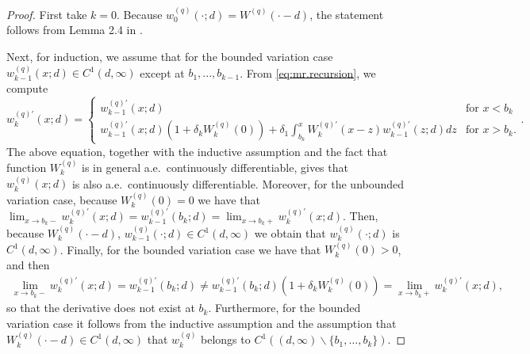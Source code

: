 \documentclass[12pt,reqno]{amsart}
\theoremstyle{definition}
\theoremstyle{remark}
\begin{document}
	\begin{proof}
	 
First take $k=0$. Because $w_0^{(q)}(\cdot;d)=W^{(q)}(\cdot-d)$, the statement follows from Lemma 2.4 in \cite{kuznetsovetal2012}.



Next, for induction, we assume that for the bounded variation case $w_{k-1}^{(q)}(x;d) \in C^1(d,\infty)$ except at $b_1,...,b_{k-1}$.
From \eqref{eq:mr.recursion}, we compute
$$ w_k^{(q)\prime}(x;d)=\left\{\begin{array}{cc}
w_{k-1}^{(q)\prime}(x;d)& \textrm{for $x < b_k$} \\ 
w_{k-1}^{(q)\prime}(x;d)(1+\delta_k W_k^{(q)}(0))+\delta_1\int_{b_k}^x W_k^{(q)\prime}(x-z)w_{k-1}^{(q)\prime}(z;d)dz & \textrm{for $x > b_k.$}
\end{array} \right..
$$
The above equation, together with the inductive assumption and the fact that function $W_k^{(q)} $ is in general a.e.~continuously differentiable, 
gives that $w_k^{(q)}(x;d)$ is also a.e.~continuously differentiable. 
Moreover, for the unbounded variation case, because $W_k^{(q)}(0)=0$ we have that
$\lim_{x \to b_k-}w_k^{(q)\prime}(x;d)=w_{k-1}^{(q)\prime}(b_k;d)= \lim_{x \to b_k +}w_k^{(q)\prime}(x;d)$. 
Then, because $W_k^{(q)}(\cdot-d)$, $w_{k-1}^{(q)}(\cdot;d) \in C^1(d,\infty)$ we obtain that $w_k^{(q)}(\cdot;d)$ is $C^1(d,\infty)$. 
Finally, for the bounded variation case we have that $W_k^{(q)}(0)>0$, and then 
\begin{align*}
\lim_{x \to b_k-}w_k^{(q)\prime}(x;d)=w_{k-1}^{(q)\prime}(b_k;d) \neq 
w_{k-1}^{(q)\prime}(b_k;d)(1+\delta_k W_k^{(q)}(0))= \lim_{x \to b_k+}w_k^{(q)\prime}(x;d),
\end{align*}
so that the derivative does not exist at $b_k$. 
Furthermore, for the bounded variation case it follows from the inductive assumption and the assumption that $W_k^{(q)}(\cdot-d) \in C^1(d,\infty)$ that
$w_k^{(q)}$ belongs to $C^1((d,\infty) \backslash \{ b_1, \ldots, b_k\})$.
 
\end{proof}
\end{document}
